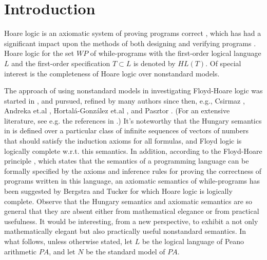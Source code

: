 \documentclass[a4paper,11pt]{article}
\begin{document}
\section{Introduction}
Hoare logic is an axiomatic system of proving programs correct \cite{apt_1,floyd_1,hoare_1}, which has had a significant impact upon the methods of both designing and verifying programs \cite{mirkowska_1,harel_1,reynolds_1}. Hoare logic for the set $WP$ of while-programs with the first-order logical language $L$ and the first-order specification $T\subset L$ is denoted by $HL(T)$. Of special interest is the completeness of Hoare logic over nonstandard models.

The approach of using nonstandard models \cite{AvBBN14} in investigating Floyd-Hoare logic was started in \cite{andreka_1,andreka_2,andreka_3}, and pursued, refined by many authors since then, e.g., Csirmaz \cite{csirmaz_1}, Andreka et.al \cite{andreka_4}, Hortal\'{a}-Gonz\'{a}lez et.al \cite{hortala_1}, and Pasztor \cite{pasztor_1}. (For an extensive literature, see e.g. the references in \cite{makowsky_1}.) It's noteworthy that the Hungary semantics in \cite{andreka_3} is defined over a particular class of infinite sequences of vectors of numbers that should satisfy the induction axioms for all formulas, and Floyd logic is logically complete w.r.t. this semantics. In addition, according to the Floyd-Hoare principle \cite{floyd_1, hoare_1}, which states that the semantics of a programming language can be formally specified by the axioms and inference rules for proving the correctness of programs written in this language, an axiomatic semantics of while-programs has been suggested by Bergstra and Tucker \cite{bergstra_1} for which Hoare logic is logically complete. Observe that the Hungary semantics and axiomatic semantics are so general that they are absent either from mathematical elegance or from practical usefulness. It would be interesting, from a new perspective, to exhibit a not only mathematically elegant but also practically useful nonstandard semantics. In what follows, unless otherwise stated, let $L$ be the logical language of Peano arithmetic $PA$, and let $N$ be the standard model of $PA$.
\end{document}

